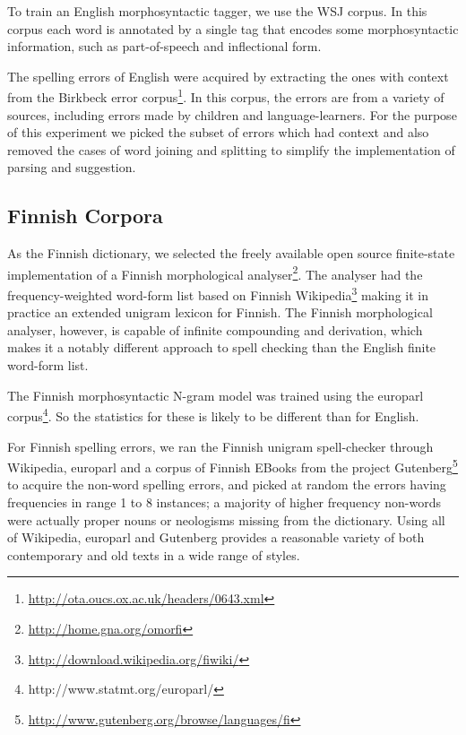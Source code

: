 \documentclass{llncs}
\begin{document}
To train an English morphosyntactic tagger, we use the WSJ corpus. In
this corpus each word is annotated by a single tag that encodes some
morphosyntactic information, such as part-of-speech and inflectional form. 

The spelling errors of English were acquired by extracting the ones with
context from the Birkbeck error
corpus\footnote{\url{http://ota.oucs.ox.ac.uk/headers/0643.xml}}. In this
corpus, the errors are from a variety of sources, including errors made by
children and language-learners. For the purpose of this experiment we picked
the subset of errors which had context and also removed the cases of word
joining and splitting to simplify the implementation of parsing and suggestion.

\subsection{Finnish Corpora}

As the Finnish dictionary, we selected the freely available open source
finite-state implementation of a Finnish morphological
analyser\footnote{\url{http://home.gna.org/omorfi}}. The analyser had the
frequency-weighted word-form list based on Finnish
Wikipedia\footnote{\url{http://download.wikipedia.org/fiwiki/}} making it in
practice an extended unigram lexicon for Finnish. The Finnish morphological
analyser, however, is capable of infinite compounding and derivation, which
makes it a notably different approach to spell checking than the English finite
word-form list. 

The Finnish morphosyntactic N-gram model was trained using the europarl
corpus\footnote{http://www.statmt.org/europarl/}.
So the statistics for these is likely to be different than for English.

For Finnish spelling errors, we ran the Finnish unigram spell-checker through
Wikipedia, europarl and a corpus of Finnish EBooks from the project
Gutenberg\footnote{\url{http://www.gutenberg.org/browse/languages/fi}} to
acquire the non-word spelling errors, and picked at random the errors having
frequencies in range 1 to 8 instances; a majority of higher frequency non-words
were actually proper nouns or neologisms missing from the dictionary. Using all of
Wikipedia, europarl and Gutenberg provides a reasonable variety of both
contemporary and old texts in a wide range of styles.
\end{document}
